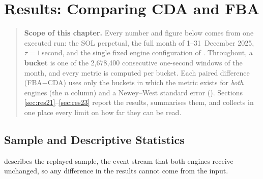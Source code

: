 \chapter{Results: Comparing CDA and FBA}
\label{ch:results}

\begin{quote}
\small
\textbf{Scope of this chapter.} Every number and figure below comes from
one executed run: the SOL perpetual, the full month of 1--31~December 2025,
$\tau = 1$\,second, and the single fixed engine configuration of
. Throughout, a \textbf{bucket} is one of the 2,678,400
consecutive one-second windows of the month, and every metric is computed
per bucket. Each paired difference (FBA$-$CDA) uses only the buckets in
which the metric exists for \emph{both} engines (the $n$ column) and a
Newey--West standard error (). Sections
\ref{sec:res21}--\ref{sec:res23} report the results, 
summarises them, and  collects in one place
every limit on how far they can be read.
\end{quote}

\section{Sample and Descriptive Statistics}
\label{sec:sample}

 describes the replayed sample, the event stream that both
engines receive unchanged, so any difference in the results cannot come from
the input.

